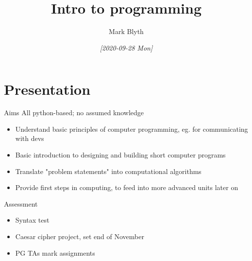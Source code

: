 \documentclass[presentation]{beamer}
\author{Mark Blyth}
\date{\textit{[2020-09-28 Mon]}}
\title{Intro to programming}
\begin{document}
\maketitle

\section{Presentation}
\label{sec:org7b168b8}
\begin{frame}[<+->][label={sec:org18901f3}]{Aims}
All python-based; no assumed knowledge
\vfill
\begin{itemize}
\item Understand basic principles of computer programming, eg. for communicating with devs
\end{itemize}
\vfill
\begin{itemize}
\item Basic introduction to designing and building short computer programs
\end{itemize}
\vfill
\begin{itemize}
\item Translate "problem statements" into computational algorithms
\end{itemize}
\vfill
\begin{itemize}
\item Provide first steps in computing, to feed into more advanced units later on
\end{itemize}
\end{frame}

\begin{frame}[label={sec:org51ff739}]{Assessment}
\begin{itemize}
\item Syntax test
\end{itemize}
\vfill
\begin{itemize}
\item Caesar cipher project, set end of November
\end{itemize}
\vfill
\begin{itemize}
\item PG TAs mark assignments
\end{itemize}
\end{frame}
\end{document}
